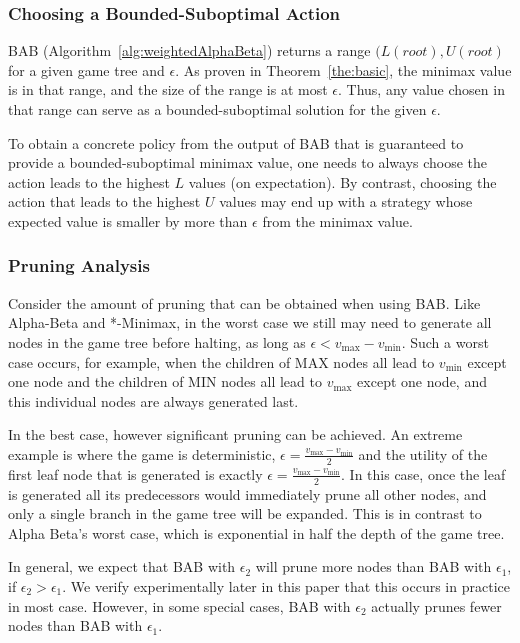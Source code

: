 \documentclass[letterpaper]{article} %
\newcommand{\pess}{\mathit{L}}
\newcommand{\opti}{\mathit{U}}
\newcommand{\vmax}{v_{\text{max}}}
\newcommand{\vmin}{v_{\text{min}}}
\newcommand{\rootnode}{\mathit{root}}
\begin{document}
\subsubsection{Choosing a Bounded-Suboptimal Action}
BAB (Algorithm~\ref{alg:weightedAlphaBeta}) returns a range $(\pess(\rootnode), \opti(\rootnode)$ for a given game tree and $\epsilon$. As proven in Theorem~\ref{the:basic}, the minimax value is in that range, and the size of the range is at most $\epsilon$. Thus, any value chosen in that range can serve as a bounded-suboptimal solution for the given $\epsilon$. 

To obtain a concrete policy from the output of BAB that is guaranteed to provide a bounded-suboptimal minimax value, one needs to always choose the action leads to the highest $\pess$ values (on expectation). By contrast, choosing the action that leads to the highest $\opti$ values may end up with a strategy whose expected value is smaller by more than $\epsilon$ from the minimax value. 





\subsubsection{Pruning Analysis}


Consider the amount of pruning that can be obtained when using BAB. Like Alpha-Beta and *-Minimax, in the worst case we still may need to generate all nodes in the game tree before halting, as long as $\epsilon<\vmax-\vmin$. 
Such a worst case occurs, for example, when the children of MAX nodes all lead to $\vmin$ except one node
and the children of MIN nodes all lead to $\vmax$ except one node, and this individual nodes are always generated last. 

In the best case, however significant pruning can be achieved. An extreme example is where
the game is deterministic, 
$\epsilon=\frac{\vmax-\vmin}{2}$ and 
the utility of the first leaf node that is generated is exactly $\epsilon=\frac{\vmax-\vmin}{2}$. 
In this case, once the leaf is generated all its predecessors would immediately prune all other nodes, 
and only a single branch in the game tree will be expanded. This is in contrast to Alpha Beta's worst case, which is exponential in half the depth of the game tree. 


In general, we expect that  BAB with  $\epsilon_2$ will prune more nodes than BAB with $\epsilon_1$, if $\epsilon_2 > \epsilon_1$. We verify experimentally later in this paper that this occurs in practice in most case. However, in some special cases, BAB with $\epsilon_2$ actually prunes fewer nodes than BAB with $\epsilon_1$. 
\end{document}
